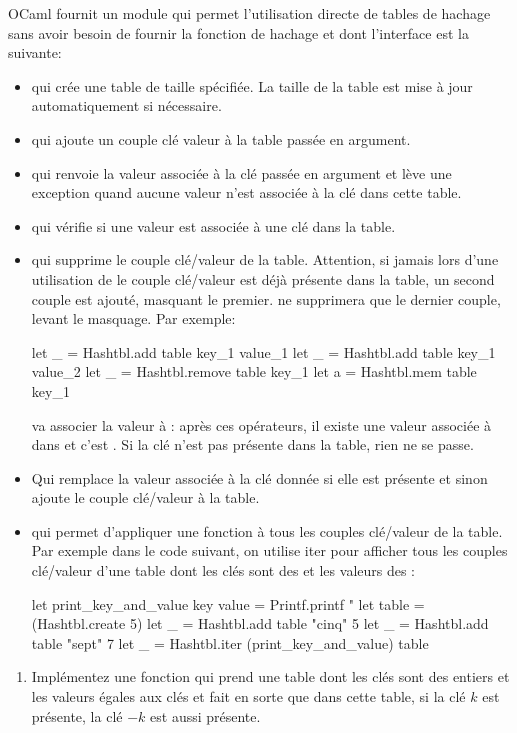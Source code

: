 \documentclass[a4paper, 10pt]{article}
\begin{document}
OCaml fournit un module  qui permet l'utilisation directe de tables de hachage sans avoir besoin de fournir la fonction de hachage et dont l'interface est la suivante:
\begin{itemize}
\item {} qui crée une table de taille spécifiée. La taille de la table est mise à jour automatiquement si nécessaire.
\item {} qui ajoute un couple clé valeur à la table passée en argument.
\item {} qui renvoie la valeur associée à la clé passée en argument et lève une exception quand aucune valeur n'est associée à la clé dans cette table.
\item {} qui vérifie si une valeur est associée à une clé dans la table.
\item {} qui supprime le couple clé/valeur de la table. Attention, si jamais lors d'une utilisation de  le couple clé/valeur est déjà présente dans la table, un second couple est ajouté, masquant le premier.  ne supprimera que le dernier couple, levant le masquage. Par exemple:
  \begin{ocamlcode}
    let _ = Hashtbl.add table key_1 value_1
    let _ = Hashtbl.add table key_1 value_2
    let _ = Hashtbl.remove table key_1
    let a = Hashtbl.mem table key_1
  \end{ocamlcode}
  va associer la valeur  à : après ces opérateurs, il existe une valeur associée à  dans  et c'est .
  Si la clé n'est pas présente dans la table, rien ne se passe.
\item {} Qui remplace la valeur associée à la clé donnée si elle est présente et sinon ajoute le couple clé/valeur à la table.
\item {} qui permet d'appliquer une fonction à tous les couples clé/valeur de la table. Par exemple dans le code suivant, on utilise iter pour afficher tous les couples clé/valeur d'une table dont les clés sont des  et les valeurs des :
  \begin{ocamlcode}
    let print_key_and_value key value =
      Printf.printf "%
    let table = (Hashtbl.create 5)
    let _ = Hashtbl.add table "cinq" 5
    let _ = Hashtbl.add table "sept" 7
    let _ = Hashtbl.iter (print_key_and_value) table
  \end{ocamlcode}
\end{itemize}
\begin{enumerate}[resume]
\item Implémentez une fonction  qui prend une table dont les clés sont des entiers et les valeurs égales aux clés et fait en sorte que dans cette table, si la clé \(k\) est présente, la clé \(-k\) est aussi présente.
\end{enumerate}
\end{document}
